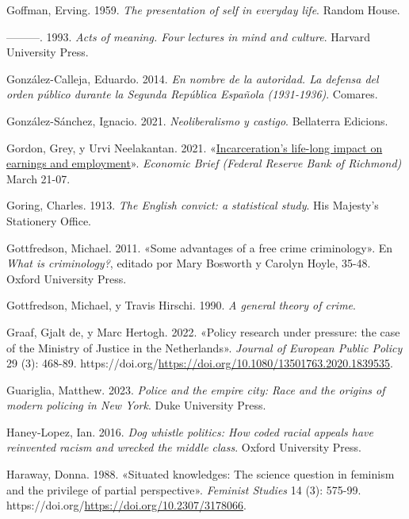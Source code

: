 \documentclass[
  spanish,
  letterpaper,
  DIV=11,
  numbers=noendperiod]{scrreprt}
\newlength{\cslhangindent}
\newenvironment{CSLReferences}[2] %
 {\begin{list}{}{%
  \setlength{\itemindent}{0pt}
  \setlength{\leftmargin}{0pt}
  \setlength{\parsep}{0pt}
  \ifodd #1
   \setlength{\leftmargin}{\cslhangindent}
   \setlength{\itemindent}{-1\cslhangindent}
  \fi
  \setlength{\itemsep}{#2\baselineskip}}}
 {\end{list}}
\begin{document}
\begin{CSLReferences}{1}{0}
Goffman, Erving. 1959. \emph{The presentation of self in everyday life}.
Random House.

---------. 1993. \emph{Acts of meaning. Four lectures in mind and
culture}. Harvard University Press.

González-Calleja, Eduardo. 2014. \emph{En nombre de la autoridad. La
defensa del orden público durante la Segunda República Española
(1931-1936)}. Comares.

González-Sánchez, Ignacio. 2021. \emph{Neoliberalismo y castigo}.
Bellaterra Edicions.

Gordon, Grey, y Urvi Neelakantan. 2021. {«\href{}{Incarceration's
life-long impact on earnings and employment}»}. \emph{Economic Brief
(Federal Reserve Bank of Richmond)} March 21-07.

Goring, Charles. 1913. \emph{The English convict: a statistical study}.
His Majesty's Stationery Office.

Gottfredson, Michael. 2011. {«Some advantages of a free crime
criminology»}. En \emph{What is criminology?}, editado por Mary Bosworth
y Carolyn Hoyle, 35-48. Oxford University Press.

Gottfredson, Michael, y Travis Hirschi. 1990. \emph{A general theory of
crime}.

Graaf, Gjalt de, y Marc Hertogh. 2022. {«Policy research under pressure:
the case of the Ministry of Justice in the Netherlands»}. \emph{Journal
of European Public Policy} 29 (3): 468-89.
https://doi.org/\url{https://doi.org/10.1080/13501763.2020.1839535}.

Guariglia, Matthew. 2023. \emph{Police and the empire city: Race and the
origins of modern policing in New York}. Duke University Press.

Haney-Lopez, Ian. 2016. \emph{Dog whistle politics: How coded racial
appeals have reinvented racism and wrecked the middle class}. Oxford
University Press.

Haraway, Donna. 1988. {«Situated knowledges: The science question in
feminism and the privilege of partial perspective»}. \emph{Feminist
Studies} 14 (3): 575-99.
https://doi.org/\url{https://doi.org/10.2307/3178066}.


\end{CSLReferences}
\end{document}
